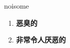 
\begin{frame}
{\huge noisome}
\begin{center}
\begin{enumerate}\Large
  \item \textbf{恶臭的}
  \item \textbf{非常令人厌恶的}
\end{enumerate}
\end{center}
\end{frame}
